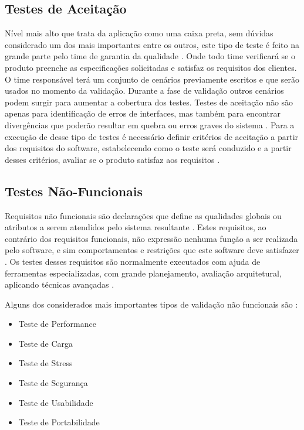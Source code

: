 \subsection{Testes de Aceitação}

Nível mais alto que trata da aplicação como uma caixa preta, sem dúvidas considerado um dos mais importantes entre os outros, este tipo de teste é feito na grande parte  pelo time de garantia da qualidade \cite{James2012}. Onde todo time verificará se o produto preenche as especificações solicitadas e satisfaz os requisitos dos clientes. O time responsável terá um conjunto de cenários previamente escritos e que serão usados no momento da validação. Durante a fase de validação outros cenários podem  surgir para aumentar a cobertura dos testes. Testes de aceitação não são apenas para identificação de erros de interfaces, mas também para encontrar divergências que poderão resultar em quebra ou erros graves do sistema \cite{tutorialsPoint}. Para a execução de desse tipo de testes é necessário definir critérios de aceitação a partir dos requisitos do software, estabelecendo como o teste será conduzido e a partir desses critérios, avaliar se o produto satisfaz aos requisitos \cite{SoftexRecife}.

\subsection{Testes Não-Funcionais}

Requisitos não funcionais são declarações que define as qualidades globais ou atributos a serem atendidos pelo sistema resultante \cite{Kirner1996}. Estes requisitos, ao contrário dos requisitos funcionais, não expressão nenhuma função a ser realizada pelo software, e sim comportamentos e restrições que este software deve satisfazer \cite{Cysneiros1997}. Os testes desses requisitos são normalmente executados com ajuda de ferramentas especializadas, com grande planejamento, avaliação arquitetural, aplicando técnicas avançadas \cite{tutorialsPoint}.

Alguns dos considerados mais importantes tipos de validação não funcionais são \cite{tutorialsPoint}:
\begin{itemize}
	\item Teste de Performance
	\item Teste de Carga
	\item Teste de Stress
	\item Teste de Segurança
	\item Teste de Usabilidade
	\item Teste de Portabilidade
\end{itemize}